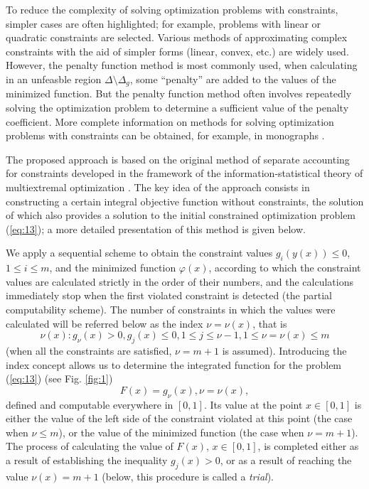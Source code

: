 \documentclass[smallextended]{svjour3}       %
\begin{document}
To reduce the complexity of solving optimization problems with constraints, simpler cases are often highlighted; for example, problems with linear or quadratic constraints are selected. Various methods of approximating complex constraints with the aid of simpler forms (linear, convex, etc.) are widely used. However, the penalty function method is most commonly used, when calculating in an unfeasble region $\Delta \setminus \Delta_g$, some ``penalty'' are added to the values of the minimized function. But the penalty function method often involves repeatedly solving the optimization problem to determine a sufficient value of the penalty coefficient. More complete information on methods for solving optimization problems with constraints can be obtained, for example, in monographs \cite{c18,c26,c27}.

The proposed approach is based on the original method of separate accounting for constraints developed in the framework of the information-statistical theory of multiextremal optimization \cite{c18}. The key idea of the approach consists in constructing a certain integral objective function without constraints, the solution of which also provides a solution to the initial constrained optimization problem (\ref{eq:13}); a more detailed presentation of this method is given below.

We apply a sequential scheme to obtain the constraint values $g_i(y(x)) \leq 0$, $1 \leq i \leq m$, and the minimized function $\varphi(x)$, according to which the constraint values are calculated strictly in the order of their numbers, and the calculations immediately stop when the first violated constraint is detected (the partial computability scheme). The number of constraints in which the values were calculated will be referred below as the index $\nu=\nu(x)$, that is
\begin{equation}\label{eq:15}
\nu(x) : g_\nu(x)>0, g_j(x)\leq 0, 1 \leq j\leq \nu - 1, 1\leq \nu = \nu(x) \leq m
\end{equation}
 (when all the constraints are satisfied, $\nu=m+1$ is assumed). Introducing the index concept allows us to determine the integrated function for the problem (\ref{eq:13}) (see Fig. \ref{fig:1})
\begin{equation}\label{eq:16}
F(x)=g_\nu(x), \nu=\nu(x),
\end{equation}
defined and computable everywhere in $[0,1]$. Its value at the point $x\in [0,1]$ is either the value of the left side of the constraint violated at this point (the case when $\nu \leq m$), or the value of the minimized function (the case when $\nu = m + 1$). The process of calculating the value of $F(x)$, $x\in [0,1]$, is completed either as a result of establishing the inequality $g_j(x)>0$, or as a result of reaching the value $\nu(x)=m+1$ (below, this procedure is called a \textit{trial}).
\end{document}
